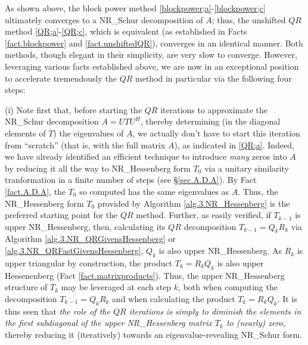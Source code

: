 
\noindent As shown above, the block power method \eqref{blockpower;a}-\eqref{blockpower;c} ultimately converges to a NR_Schur decomposition of $A$; thus, the unshifted
$QR$ method \eqref{QR;a}-\eqref{QR;c}, which is equivalent (as established in Facts \ref{fact.blockpower} and \ref{fact.unshiftedQR}), converges in an identical manner.
Both methods, though elegant in their simplicity, are very slow to converge.
However, leveraging various facts established above, we are now in an exceptional position to accelerate tremendously the $QR$ method in particular via the following
four steps:\vskip0.1in

\noindent (i)
Note first that, before starting the $QR$ iterations to approximate the NR_Schur decomposition $A=UTU^H$, thereby determining (in the diagonal elements of $T$)
the eigenvalues of $A$, we actually don't have to start this iteration from ``scratch'' (that is, with the full matrix $A$), as indicated in
\eqref{QR;a}.  Indeed, we have already identified an efficient technique to introduce {\it many} zeros into $A$ by reducing it all the way
to NR_Hessenberg form $T_0$ via a unitary similarity tranformation in a finite number of steps (see \S \ref{sec.A.D.A}).
By Fact \ref{fact.A.D.A}, the $T_0$ so computed has the same eigenvalues as $A$.
Thus, {the NR_Hessenberg form $T_0$ provided by Algorithm \ref{alg.3.NR_Hessenberg} is the preferred starting point for the $QR$ method.}
Further, as easily verified, if $T_{k-1}$ is upper NR_Hessenberg, then, calculating its $QR$ decomposition $T_{k-1}={Q}_{k} {R}_{k}$
via Algorithm \ref{alg.3.NR_QRGivensHessenberg} or \ref{alg.3.NR_QRFastGivensHessenberg},
${Q}_{k}$ is also upper NR_Hessenberg.  As ${R}_{k}$ is upper triangular by construction, the product $T_{k} = {R}_{k} {Q}_{k}$
is also upper Hessenenberg (Fact \ref{fact.matrixproducts}).  Thus, the upper NR_Hessenberg structure of $T_{k}$ may be leveraged at each step $k$, both when computing the
decomposition $T_{k-1}={Q}_{k} {R}_{k}$ and when calculating the product $T_{k} = {R}_{k} {Q}_{k}$.  It is thus seen that
{\it the role of the $QR$ iterations is simply to diminish the elements in the first subdiagonal of the upper NR_Hessenberg matrix $T_{k}$ to (nearly) zero},
thereby reducing it (iteratively) towards an eigenvalue-revealing NR_Schur form.\vskip0.1in


